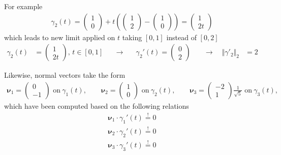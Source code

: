 \documentclass[12pt]{article}
\begin{document}
\begin{enumerate}[(i)]
\begin{observationboxed}
		      For example
		      \begin{align}
			      \gamma_2(t) = 
			      \begin{pmatrix} 1 \\ 0 \end{pmatrix}
			      + t
			      \left(
			      \begin{pmatrix} 1 \\ 2 \end{pmatrix}
			      -
			      \begin{pmatrix} 1 \\ 0 \end{pmatrix}
			      \right)
			      =
			      \begin{pmatrix} 1 \\ 2t \end{pmatrix}
		      \end{align}
		      which leads to new limit applied on $t$ taking $\left[ 0,1 \right]$
		      instead of $\left[ 0,2 \right]$
		      \begin{align}
			      \gamma_2(t)
			       & = \begin{pmatrix} 1\\ 2t \end{pmatrix}, \, t\in \left[ 0,1 \right]
			       & \quad \rightarrow
			       & \quad
			      \gamma_2'(t) = \begin{pmatrix} 0\\ 2 \end{pmatrix}
			       & \quad \rightarrow
			      \quad
			      \Vert \gamma'_2 \Vert_2
			       & = 2
		      \end{align}
	      \end{observationboxed}
	      
	      Likewise, normal vectors take the form
	      \begin{align}
		      \boxed{
			      \bm{\nu}_1 = \begin{pmatrix}0\\-1\end{pmatrix} \text{ on}\ \gamma_1(t),
			      \qquad
			      \bm{\nu}_2 = \begin{pmatrix}1\\0\end{pmatrix} \text{ on}\ \gamma_2(t),
			      \qquad
			      \bm{\nu}_3 = \begin{pmatrix}-2\\1\end{pmatrix}\frac{1}{\sqrt{5}} \text{ on}\ \gamma_3(t),
		      }
	      \end{align}
	      which have been computed based on the following relations
	      \begin{align}
		      \bm{\nu}_{1}\cdot\gamma_{1}'(t) \stackrel{!}{=} 0 \\
		      \bm{\nu}_{2}\cdot\gamma_{2}'(t) \stackrel{!}{=} 0 \\
		      \bm{\nu}_{3}\cdot\gamma_{3}'(t) \stackrel{!}{=} 0 
	      \end{align}
	      

\end{enumerate}
\end{document}
